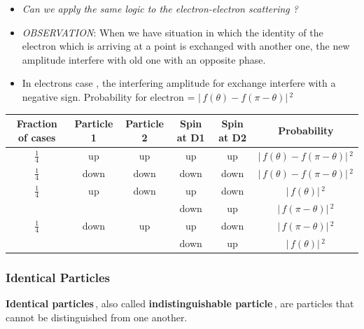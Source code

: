 \documentclass[aspectratio=169]{beamer}
\begin{document}
\begin{frame}
	
	\begin{itemize}
		\item \textit{Can we apply the same logic to the electron-electron scattering ? }\pause \newline
		\item \textit{OBSERVATION}: When we have situation in which the identity of the electron which is arriving at a point is exchanged with another one, the new amplitude interfere with old one with an opposite phase. \pause \newline
		\item In electrons case , the interfering amplitude for exchange interfere with a negative sign. \pause \newline
		Probability for electron = $\rvert\,f(\theta)-f(\pi-\theta)\rvert\,^{2}$
		 \end{itemize}
\end{frame}

\begin{frame}
\begin{tabular}{|c|cc|cc|c|}
\hline
Fraction of cases & Particle 1 & Particle 2 & Spin at D1 & Spin at D2 & Probability \\ \hline
$\frac{1}{4}$ & up & up & up & up & $\rvert\,f(\theta)-f(\pi-\theta)\rvert\,^{2}$ \\ \hline
$\frac{1}{4}$ & down & down & down & down & $\rvert\,f(\theta)-f(\pi-\theta)\rvert\,^{2}$ \\ \hline
$\frac{1}{4}$ & up & down & up & down & $\rvert\,f(\theta)\rvert\,^{2}$ \\ \cline{4-6}
 &  &  & down & up & $\rvert\,f(\pi -\theta)\rvert\,^{2}$ \\ \hline
$\frac{1}{4}$ & down & up & up & down & $\rvert\,f(\pi-\theta)\rvert\,^{2}$ \\ \cline{4-6}
& & & down & up & $\rvert\,f(\theta)\rvert\,^{2}$ \\ \hline
\end{tabular}
\end{frame}

\begin{frame}
	\frametitle{Identical Particles}
	
		{\large \textbf{Identical particles}\,, also called \textbf{indistinguishable particle}\,, are particles that cannot be distinguished from one another.}
		
\end{frame}
\end{document}
